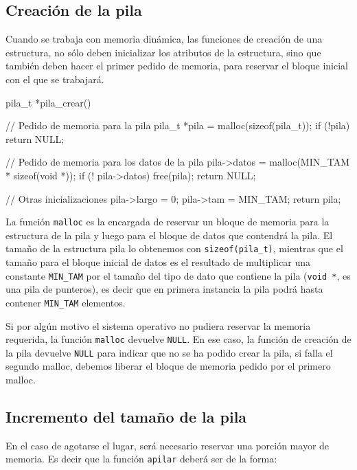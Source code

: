 \subsection{Creación de la pila}

Cuando se trabaja con memoria dinámica, las funciones de creación de una
estructura, no sólo deben inicializar los atributos de la estructura, sino que
también deben hacer el primer pedido de memoria, para reservar el bloque
inicial con el que se trabajará.

\begin{codigo-c-plano}
pila_t *pila_crear()
{
    // Pedido de memoria para la pila
    pila_t *pila = malloc(sizeof(pila_t));
    if (!pila) return NULL;

    // Pedido de memoria para los datos de la pila
    pila->datos = malloc(MIN_TAM * sizeof(void *));
    if (! pila->datos) {
        free(pila);
        return NULL;
    }

    // Otras inicializaciones
    pila->largo = 0;
    pila->tam = MIN_TAM;
    return pila;
}
\end{codigo-c-plano}

La función \lstinline!malloc! es la encargada de reservar un bloque de memoria
para la estructura de la pila y luego para el bloque de datos que contendrá la
pila. El tamaño de la estructura pila lo obtenemos con
\lstinline!sizeof(pila_t)!, mientras que el tamaño para el bloque inicial de
datos es el resultado de multiplicar una constante \lstinline!MIN_TAM! por el
tamaño del tipo de dato que contiene la pila (\lstinline!void *!, es una pila
de punteros), es decir que en primera instancia la pila podrá hasta contener
\lstinline!MIN_TAM! elementos.

Si por algún motivo el sistema operativo no pudiera reservar la memoria
requerida, la función \lstinline!malloc! devuelve \lstinline!NULL!. En ese
caso, la función de creación de la pila devuelve \lstinline!NULL! para
indicar que no se ha podido crear la pila, si falla el segundo malloc, debemos
liberar el bloque de memoria pedido por el primero malloc.

\subsection{Incremento del tamaño de la pila}

En el caso de agotarse el lugar, será necesario reservar una porción mayor de
memoria.  Es decir que la función \lstinline!apilar! deberá ser de la forma:

